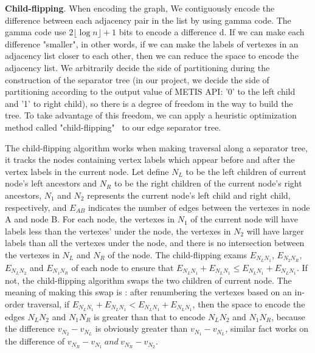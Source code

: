 \documentclass[12pt,glossary]{dalthesis}
\begin{document}
\textbf{Child-flipping}. When encoding the graph, We contiguously encode the difference between each adjacency pair in the list by using gamma code. The gamma code use $2\lfloor \log n \rfloor + 1$ bits to encode a difference d. If we can make each difference "smaller", in other words, if we can make the labels of vertexes in an adjacency list closer to each other, then we can reduce the space to encode the adjacency list. We arbitrarily decide the side of partitioning during the construction of the separator tree (in our project, we decide the side of partitioning according to the output value of METIS API: '0' to the left child and '1' to right child), so there is a degree of freedom in the way to build the tree. To take advantage of this freedom, we can apply a heuristic optimization method called "child-flipping"~\cite{compact-representation} to our edge separator tree.

The child-flipping algorithm works when making traversal along a separator tree, it tracks the nodes containing vertex labels which appear before and after the vertex labels in the current node. Let define $N_{L}$ to be the left children of current node's left ancestors and $N_{R}$ to be the right children of the current node's right ancestors, $N_{1}$ and $N_{2}$ represents the current node's left child and right child, respectively, and $E_{AB}$ indicates the number of edges between the vertexes in node A and node B. For each node, the vertexes in $N_{1}$ of the current node will have labels less than the vertexes' under the node, the vertexes in $N_{2}$ will have larger labels than all the vertexes under the node, and there is no intersection between the vertexes in $N_{L}$ and $N_{R}$ of the node. The child-flipping exams $E_{N_{L}N_{1}}$, $E_{N_{2}N_{R}}$, $E_{N_{L}N_{2}}$ and $E_{N_{1}N_{R}}$ of each node to ensure that $E_{N_{L}N_{1}} + E_{N_{L}N_{1}} \leq E_{N_{L}N_{1}} + E_{N_{L}N_{1}}$. If not, the child-flipping algorithm swaps the two children of current node. The meaning of making this swap is : after renumbering the vertexes based on an in-order traversal, if $E_{N_{L}N_{1}} + E_{N_{L}N_{1}} < E_{N_{L}N_{1}} + E_{N_{L}N_{1}}$, then the space to encode the edges $N_{L}N_{2}$ and $N_{1}N_{R}$ is greater than that to encode $N_{L}N_{2}$ and $N_{1}N_{R}$, because the difference $v_{N_{2}} -v_{N_{L}}$ is obviously greater than $v_{N_{1}} - v_{N_{L}}$, similar fact works on the difference of $v_{N_{R}}-v_{N_{1}} \  and \  v_{N_{R}}-v_{N_{2}}$.

\bigskip
\bigskip
\end{document}
